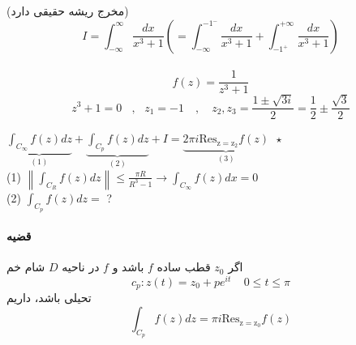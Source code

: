 \example
(مخرج ریشه حقیقی دارد)
\begin{equation*}
I=\int_{-\infty}^{\infty} \frac{d x}{x^{3}+1}\left(=\int_{-\infty}^{-1^-} \frac{d x}{x^{3}+1}+\int_{-1^+}^{+\infty} \frac{d x}{x^{3}+1}\right)
\end{equation*}
\\
\begin{equation*}
f(z)=\frac{1}{z^{3}+1}
\end{equation*}
\begin{equation*}
z^{3}+1=0  \ \ \ \ , \ \ \  z_{1}=-1 \quad,\quad
 z_{2}, z_{3}=\frac{1 \pm \sqrt{3 i}}{2}=\frac{1}{2} \pm \frac{\sqrt{3}}{2}
\end{equation*}

\begin{latin}

$
\underbrace{
\int_{C_{\infty}} f(z) d z}_{(1)}
+
\underbrace{\int_{C_{p}} f(z) d z}_{(2)}
+I=
\underbrace{2 \pi i \operatorname{Res_{z=z_2}} f(z)}_{(3)}
 \ \ \star$
\\
(1) \quad $\left\|\int_{C_{R}} f(z) d z\right\| \leqslant \frac{\pi R}{R^{3}-1} \rightarrow \int_{C_{\infty}} f(z) d x=0$
\\
(2) \quad $\int_{C_{p}} f(z) d z=$ ?

\end{latin}

\paragraph{قضیه}
اگر 
$z_0$
قطب ساده‌ 
$f$
باشد و 
$f$
در ناحیه‌
$D$
شام خم
$$c_{p} : z(t) = z_{0} + pe^{it}    \ \ \  \ \ 0\leq t \leq \pi$$
تحیلی باشد، داریم 
$$\int_{C_{p}} f(z) d z= \pi i \operatorname{Res_{z=z_0}} f(z)$$

